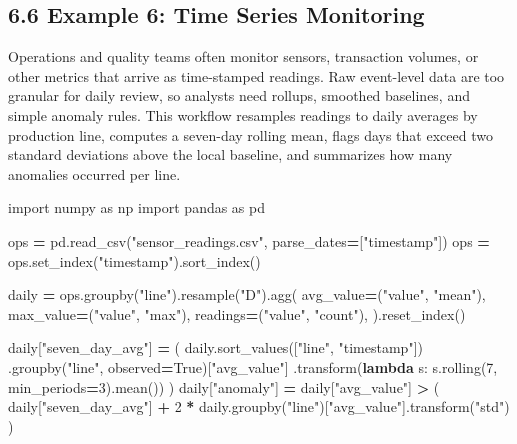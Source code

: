 \documentclass[
  12pt,
]{article}
\newenvironment{Shaded}{\begin{snugshade}}{\end{snugshade}}
\newcommand{\DecValTok}[1]{\textcolor[rgb]{0.00,0.00,0.81}{#1}}
\newcommand{\ImportTok}[1]{#1}
\newcommand{\KeywordTok}[1]{\textcolor[rgb]{0.13,0.29,0.53}{\textbf{#1}}}
\newcommand{\NormalTok}[1]{#1}
\newcommand{\OperatorTok}[1]{\textcolor[rgb]{0.81,0.36,0.00}{\textbf{#1}}}
\newcommand{\StringTok}[1]{\textcolor[rgb]{0.31,0.60,0.02}{#1}}
\newcommand{\VariableTok}[1]{\textcolor[rgb]{0.00,0.00,0.00}{#1}}
\begin{document}
\subsection{6.6 Example 6: Time Series
Monitoring}\label{example-6-time-series-monitoring}

Operations and quality teams often monitor sensors, transaction volumes,
or other metrics that arrive as time-stamped readings. Raw event-level
data are too granular for daily review, so analysts need rollups,
smoothed baselines, and simple anomaly rules. This workflow resamples
readings to daily averages by production line, computes a seven-day
rolling mean, flags days that exceed two standard deviations above the
local baseline, and summarizes how many anomalies occurred per line.

\begin{Shaded}
\begin{Highlighting}[]
\ImportTok{import}\NormalTok{ numpy }\ImportTok{as}\NormalTok{ np}
\ImportTok{import}\NormalTok{ pandas }\ImportTok{as}\NormalTok{ pd}

\NormalTok{ops }\OperatorTok{=}\NormalTok{ pd.read\_csv(}\StringTok{"sensor\_readings.csv"}\NormalTok{, parse\_dates}\OperatorTok{=}\NormalTok{[}\StringTok{"timestamp"}\NormalTok{])}
\NormalTok{ops }\OperatorTok{=}\NormalTok{ ops.set\_index(}\StringTok{"timestamp"}\NormalTok{).sort\_index()}

\NormalTok{daily }\OperatorTok{=}\NormalTok{ ops.groupby(}\StringTok{"line"}\NormalTok{).resample(}\StringTok{"D"}\NormalTok{).agg(}
\NormalTok{    avg\_value}\OperatorTok{=}\NormalTok{(}\StringTok{"value"}\NormalTok{, }\StringTok{"mean"}\NormalTok{),}
\NormalTok{    max\_value}\OperatorTok{=}\NormalTok{(}\StringTok{"value"}\NormalTok{, }\StringTok{"max"}\NormalTok{),}
\NormalTok{    readings}\OperatorTok{=}\NormalTok{(}\StringTok{"value"}\NormalTok{, }\StringTok{"count"}\NormalTok{),}
\NormalTok{).reset\_index()}

\NormalTok{daily[}\StringTok{"seven\_day\_avg"}\NormalTok{] }\OperatorTok{=}\NormalTok{ (}
\NormalTok{    daily.sort\_values([}\StringTok{"line"}\NormalTok{, }\StringTok{"timestamp"}\NormalTok{])}
\NormalTok{    .groupby(}\StringTok{"line"}\NormalTok{, observed}\OperatorTok{=}\VariableTok{True}\NormalTok{)[}\StringTok{"avg\_value"}\NormalTok{]}
\NormalTok{    .transform(}\KeywordTok{lambda}\NormalTok{ s: s.rolling(}\DecValTok{7}\NormalTok{, min\_periods}\OperatorTok{=}\DecValTok{3}\NormalTok{).mean())}
\NormalTok{)}
\NormalTok{daily[}\StringTok{"anomaly"}\NormalTok{] }\OperatorTok{=}\NormalTok{ daily[}\StringTok{"avg\_value"}\NormalTok{] }\OperatorTok{\textgreater{}}\NormalTok{ (}
\NormalTok{    daily[}\StringTok{"seven\_day\_avg"}\NormalTok{]}
    \OperatorTok{+} \DecValTok{2} \OperatorTok{*}\NormalTok{ daily.groupby(}\StringTok{"line"}\NormalTok{)[}\StringTok{"avg\_value"}\NormalTok{].transform(}\StringTok{"std"}\NormalTok{)}
\NormalTok{)}


\end{Highlighting}
\end{Shaded}
\end{document}
